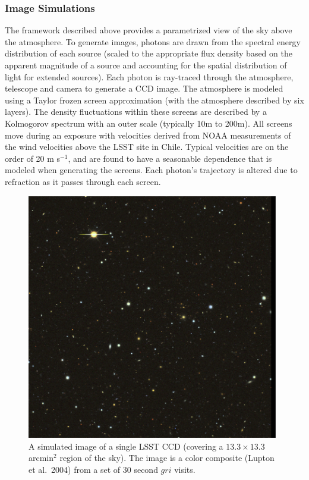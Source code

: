 \documentclass{emulateapj}
\begin{document}
{\subsubsection{Image Simulations}
\label{sec:imsim}

The framework described above provides a parametrized view of the sky
above the atmosphere. To generate images, photons are drawn from the
spectral energy distribution of each source (scaled to the appropriate
flux density based on the apparent magnitude of a source and
accounting for the spatial distribution of light for extended
sources). Each photon is ray-traced through the atmosphere, telescope
and camera to generate a CCD image. The atmosphere is modeled using a
Taylor frozen screen approximation (with the atmosphere described by
six layers). The density fluctuations within these screens are
described by a Kolmogorov spectrum with an outer scale (typically 10m
to 200m). All screens move during an exposure with velocities derived
from NOAA measurements of the wind velocities above the LSST site in
Chile.  Typical velocities are on the order of 20 m s$^{-1}$, and are
found to have a seasonable dependence that is modeled when generating
the screens. Each photon's trajectory is altered due to refraction as
it passes through each screen.


\begin{figure}
\centerline{\includegraphics[width=0.98\textwidth,clip]{chip2014.jpg}}
\caption{ A simulated image of a single LSST CCD (covering a
  $13.3\times13.3$ arcmin$^2$ region of the sky). The image is a color
  composite (Lupton et al.~2004) from a set of 30 second $gri$ visits.}
\label{Fig:ImSimExample}
\end{figure}




}
\end{document}
